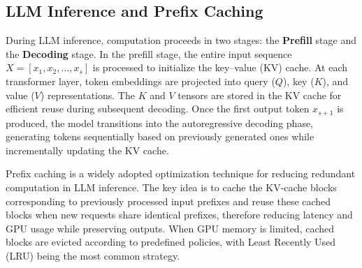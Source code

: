 


\subsection{LLM Inference and Prefix Caching}\label{sec:kv_cache_background}

During LLM inference, computation proceeds in two stages: the \textbf{Prefill} stage and the \textbf{Decoding} stage. 
In the prefill stage, the entire input sequence $X = [x_1, x_2, \ldots, x_s]$ is processed to initialize the key–value (KV) cache. 
At each transformer layer, token embeddings are projected into query ($Q$), key ($K$), and value ($V$) representations. 
The $K$ and $V$ tensors are stored in the KV cache for efficient reuse during subsequent decoding. 
Once the first output token $x_{s+1}$ is produced, the model transitions into the autoregressive decoding phase, generating tokens sequentially based on previously generated ones while incrementally updating the KV cache.

Prefix caching is a widely adopted optimization technique for reducing redundant computation in LLM inference. 
The key idea is to cache the KV-cache blocks corresponding to previously processed input prefixes and reuse these cached blocks when new requests share identical prefixes, therefore reducing latency and GPU usage while preserving outputs. 
When GPU memory is limited, cached blocks are evicted according to predefined policies, with Least Recently Used (LRU) being the most common strategy.






